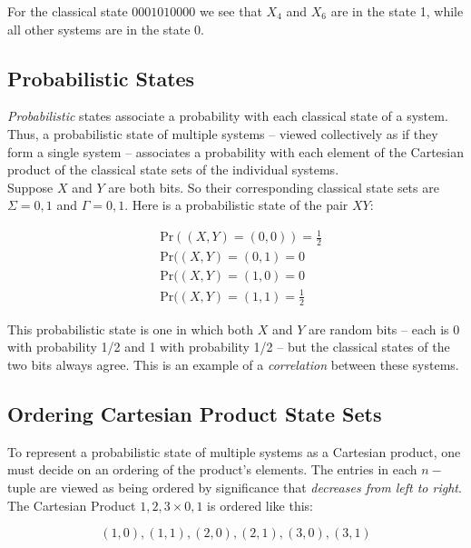 \documentclass[svgnames]{article}     %
\begin{document}
For the classical state $0001010000$ we see that $X_4$ and $X_6$ are in the
state 1, while all other systems are in the state 0. 

\subsection{Probabilistic States}

\textit{Probabilistic} states associate a probability with each classical state
of a system. Thus, a probabilistic state of multiple systems -- viewed
collectively as if they form a single system -- associates a probability with
each element of the Cartesian product of the classical state sets of the
individual systems. \\

Suppose $X$ and $Y$ are both bits. So their corresponding classical state sets
are $\Sigma = {0, 1}$ and  $\Gamma = {0, 1}$. Here is a probabilistic state of
the pair  $XY$: 

 \begin{align*}
   &\text{Pr}((X,Y) = (0,0)) = \frac{1}{2} \\
   &\text{Pr} ((X,Y) = (0, 1) = 0 \\
   &\text{Pr} ((X,Y) = (1, 0) = 0 \\
   &\text{Pr} ((X,Y) = (1, 1) = \frac{1}{2}
\end{align*}

This probabilistic state is one in which both $X$ and $Y$ are random bits --
each is 0 with probability 1/2 and 1 with probability 1/2 -- but the classical
states of the two bits always agree. This is an example of
a \textit{correlation} between these systems.

\subsection{Ordering Cartesian Product State Sets}

To represent a probabilistic state of multiple systems as a Cartesian product,
one must decide on an ordering of the product's elements. The entries in each
$n-$ tuple are viewed as being ordered by significance that \textit{decreases
from left to right}. \\

The Cartesian Product ${1, 2, 3} \times {0, 1}$ is ordered like this: 

 \[
   (1, 0), (1, 1), (2, 0), (2, 1), (3, 0), (3, 1)
\] \vspace{5px}
\end{document}
